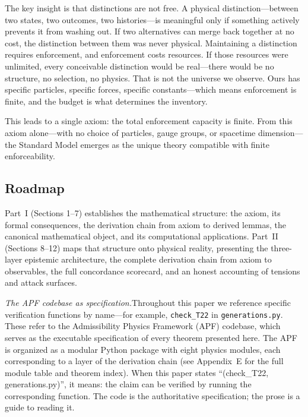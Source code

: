 \documentclass[11pt]{article}
\begin{document}
The key insight is that distinctions are not free.  A physical distinction---between two states, two outcomes, two histories---is meaningful only if something actively prevents it from washing out.  If two alternatives can merge back together at no cost, the distinction between them was never physical.  Maintaining a distinction requires enforcement, and enforcement costs resources.  If those resources were unlimited, every conceivable distinction would be real---there would be no structure, no selection, no physics.  That is not the universe we observe.  Ours has specific particles, specific forces, specific constants---which means enforcement is finite, and the budget is what determines the inventory.

This leads to a single axiom: the total enforcement capacity is finite.  From this axiom alone---with no choice of particles, gauge groups, or spacetime dimension---the Standard Model emerges as the unique theory compatible with finite enforceability.

\subsection{Roadmap}

Part~I (Sections 1--7) establishes the mathematical structure: the axiom, its formal consequences, the derivation chain from axiom to derived lemmas, the canonical mathematical object, and its computational applications.  Part~II (Sections 8--12) maps that structure onto physical reality, presenting the three-layer epistemic architecture, the complete derivation chain from axiom to observables, the full concordance scorecard, and an honest accounting of tensions and attack surfaces.

\medskip
\noindent\textit{The APF codebase as specification.}\quad Throughout this paper we reference specific verification functions by name---for example, \texttt{check\_T22} in \texttt{generations.py}.  These refer to the Admissibility Physics Framework (APF) codebase, which serves as the executable specification of every theorem presented here.  The APF is organized as a modular Python package with eight physics modules, each corresponding to a layer of the derivation chain (see Appendix~E for the full module table and theorem index).  When this paper states ``(check\_T22, generations.py)'', it means: the claim can be verified by running the corresponding function.  The code is the authoritative specification; the prose is a guide to reading it.
\end{document}
